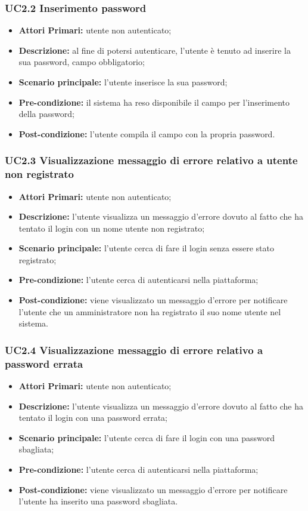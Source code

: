 \subsubsection{UC2.2 Inserimento password}
\begin{itemize}
	\item \textbf{Attori Primari:} utente non autenticato;
	\item \textbf{Descrizione:} al fine di potersi autenticare, l'utente è tenuto ad inserire la sua password, campo obbligatorio;
	\item \textbf{Scenario principale:} l'utente inserisce la sua password;
	\item \textbf{Pre-condizione:} il sistema ha reso disponibile il campo per l'inserimento della password;
	\item \textbf{Post-condizione:} l'utente compila il campo con la propria password.
\end{itemize}	

\subsubsection{UC2.3 Visualizzazione messaggio di errore relativo a utente non registrato}
\begin{itemize}
	\item \textbf{Attori Primari:} utente non autenticato;
	\item \textbf{Descrizione:} l'utente visualizza un messaggio d'errore dovuto al fatto che ha tentato il login con un nome utente non registrato;
	\item \textbf{Scenario principale:} l'utente cerca di fare il login senza essere stato registrato;
	\item \textbf{Pre-condizione:} l'utente cerca di autenticarsi nella piattaforma;
	\item \textbf{Post-condizione:} viene visualizzato un messaggio d'errore per notificare l'utente che un amministratore non ha registrato il suo nome utente nel sistema.
\end{itemize}

\subsubsection{UC2.4 Visualizzazione messaggio di errore relativo a password errata}
\begin{itemize}
	\item \textbf{Attori Primari:} utente non autenticato;
	\item \textbf{Descrizione:} l'utente visualizza un messaggio d'errore dovuto al fatto che ha tentato il login con una password errata;
	\item \textbf{Scenario principale:} l'utente cerca di fare il login con una password sbagliata;
	\item \textbf{Pre-condizione:} l'utente cerca di autenticarsi nella piattaforma;
	\item \textbf{Post-condizione:} viene visualizzato un messaggio d'errore per notificare l'utente ha inserito una password sbagliata.
\end{itemize}

